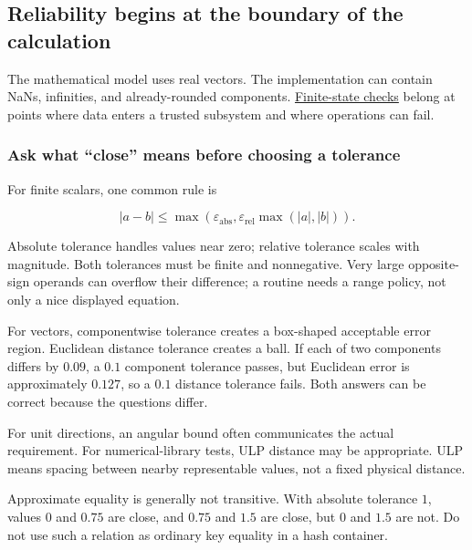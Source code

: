 \subsection{Reliability begins at the boundary of the calculation}\label{02-foundations-ii-ch037-reliability-begins-at-the-boundary-of-the-calculation}

\hypertarget{02-foundations-ii-ch037-reliability-begins-at-the-boundary-of-the-calculation}{}

The mathematical model uses real vectors. The implementation can contain NaNs, infinities, and already-rounded components. \hyperref[02-foundations-ii-ch037-reliability-begins-at-the-boundary-of-the-calculation]{Finite-state checks} belong at points where data enters a trusted subsystem and where operations can fail.

\subsubsection{Ask what ``close'' means before choosing a tolerance}\label{02-foundations-ii-ch037-ask-what-close-means-before-choosing-a-tolerance}

\hypertarget{02-foundations-ii-ch037-ask-what-close-means-before-choosing-a-tolerance}{}

For finite scalars, one common rule is

\[
|a-b|\le\max\left(\varepsilon_{\mathrm{abs}},
\varepsilon_{\mathrm{rel}}\max(|a|,|b|)\right).
\]

Absolute tolerance handles values near zero; relative tolerance scales with magnitude. Both tolerances must be finite and nonnegative. Very large opposite-sign operands can overflow their difference; a routine needs a range policy, not only a nice displayed equation.

For vectors, componentwise tolerance creates a box-shaped acceptable error region. Euclidean distance tolerance creates a ball. If each of two components differs by \(0.09\), a \(0.1\) component tolerance passes, but Euclidean error is approximately \(0.127\), so a \(0.1\) distance tolerance fails. Both answers can be correct because the questions differ.

For unit directions, an angular bound often communicates the actual requirement. For numerical-library tests, ULP distance may be appropriate. ULP means spacing between nearby representable values, not a fixed physical distance.

Approximate equality is generally not transitive. With absolute tolerance \(1\), values \(0\) and \(0.75\) are close, and \(0.75\) and \(1.5\) are close, but \(0\) and \(1.5\) are not. Do not use such a relation as ordinary key equality in a hash container.


